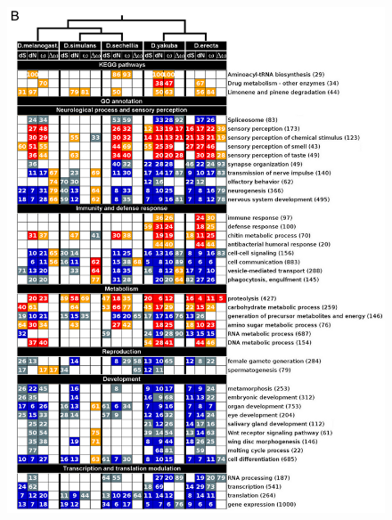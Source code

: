 \begin{figure}
\centering 
\includegraphics[width=\textwidth]{tex_source/figures/gssa/table_flies_2.png}
\end{figure}

